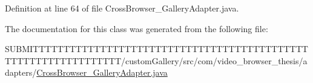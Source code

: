 Definition at line 64 of file Cross\-Browser\-\_\-\-Gallery\-Adapter.\-java.



The documentation for this class was generated from the following file\-:\begin{DoxyCompactItemize}
\item 
S\-U\-B\-M\-I\-T\-T\-T\-T\-T\-T\-T\-T\-T\-T\-T\-T\-T\-T\-T\-T\-T\-T\-T\-T\-T\-T\-T\-T\-T\-T\-T\-T\-T\-T\-T\-T\-T\-T\-T\-T\-T\-T\-T\-T\-T\-T\-T\-T\-T\-T\-T\-T\-T\-T\-T\-T\-T\-T\-T\-T\-T\-T\-T\-T\-T\-T\-T\-T/custom\-Gallery/src/com/video\-\_\-browser\-\_\-thesis/adapters/\hyperlink{_cross_browser___gallery_adapter_8java}{Cross\-Browser\-\_\-\-Gallery\-Adapter.\-java}\end{DoxyCompactItemize}

